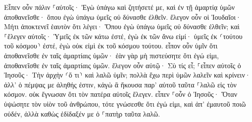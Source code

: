 \documentclass{openreader}
\begin{document}
Εἶπεν οὖν πάλιν ⸀αὐτοῖς· Ἐγὼ ὑπάγω καὶ ζητήσετέ με, καὶ ἐν τῇ ἁμαρτίᾳ ὑμῶν ἀποθανεῖσθε· ὅπου ἐγὼ ὑπάγω ὑμεῖς οὐ δύνασθε ἐλθεῖν. 
ἔλεγον οὖν οἱ Ἰουδαῖοι· Μήτι ἀποκτενεῖ ἑαυτὸν ὅτι λέγει· Ὅπου ἐγὼ ὑπάγω ὑμεῖς οὐ δύνασθε ἐλθεῖν; 
καὶ ⸀ἔλεγεν αὐτοῖς· Ὑμεῖς ἐκ τῶν κάτω ἐστέ, ἐγὼ ἐκ τῶν ἄνω εἰμί· ὑμεῖς ἐκ ⸂τούτου τοῦ κόσμου⸃ ἐστέ, ἐγὼ οὐκ εἰμὶ ἐκ τοῦ κόσμου τούτου. 
εἶπον οὖν ὑμῖν ὅτι ἀποθανεῖσθε ἐν ταῖς ἁμαρτίαις ὑμῶν· ἐὰν γὰρ μὴ πιστεύσητε ὅτι ἐγώ εἰμι, ἀποθανεῖσθε ἐν ταῖς ἁμαρτίαις ὑμῶν. 
ἔλεγον οὖν αὐτῷ· Σὺ τίς εἶ; ⸀εἶπεν αὐτοῖς ὁ Ἰησοῦς· Τὴν ἀρχὴν ⸂ὅ τι⸃ καὶ λαλῶ ὑμῖν; 
πολλὰ ἔχω περὶ ὑμῶν λαλεῖν καὶ κρίνειν· ἀλλ’ ὁ πέμψας με ἀληθής ἐστιν, κἀγὼ ἃ ἤκουσα παρ’ αὐτοῦ ταῦτα ⸀λαλῶ εἰς τὸν κόσμον. 
οὐκ ἔγνωσαν ὅτι τὸν πατέρα αὐτοῖς ἔλεγεν. 
εἶπεν ⸀οὖν ὁ Ἰησοῦς· Ὅταν ὑψώσητε τὸν υἱὸν τοῦ ἀνθρώπου, τότε γνώσεσθε ὅτι ἐγώ εἰμι, καὶ ἀπ’ ἐμαυτοῦ ποιῶ οὐδέν, ἀλλὰ καθὼς ἐδίδαξέν με ὁ ⸀πατὴρ ταῦτα λαλῶ. 
\end{document}
